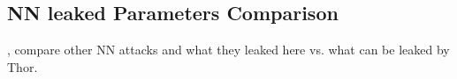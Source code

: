 


% 


\subsection{NN leaked Parameters Comparison}
{\color{red} , compare other NN attacks and what they leaked here vs. what can be leaked by Thor.}

